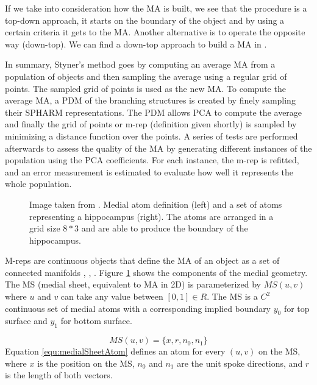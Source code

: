 If we take into consideration how the MA is built, we see that the procedure is a top-down approach, 
it starts on the boundary of the object and by using a certain criteria it gets to the MA. 
Another alternative is to operate the opposite way (down-top). 
We can find a down-top approach to build a MA in \cite{styner2001medial}.

In summary, Styner's method goes by computing an average MA
from a population of objects and then sampling the average using a regular grid of
points. The sampled grid of points is used as the new MA.
To compute the average MA, a PDM of
the branching structures is created 
by finely sampling their SPHARM representations.
The PDM allows PCA to compute the average and 
finally the grid of points or m-rep (definition given shortly) is sampled by 
minimizing a distance function over the points.
A series of tests are performed afterwards to assess
the quality of the MA by 
generating different instances of the population using 
the PCA coefficients. For each instance, the m-rep is refitted,
and an error measurement is estimated to evaluate 
how well it represents the whole population. 

\begin{figure} 
 \centering  
 \caption[Medial atom definition.]{Image taken from \cite{fletcher2004principal}. Medial atom definition (left) and a set of atoms representing a hippocampus (right).
          The atoms are arranged in a grid size $8*3$ and are able to produce the boundary of the hippocampus.}
 \label{fig:3DmedialGeometry}  
\end{figure}

M-reps are continuous objects that define the MA of an object as 
a set of connected manifolds \cite{pizer1999segmentation},  \cite{yushkevich2003continuous}, \cite{pizer2003deformable}.
Figure \ref{fig:3DmedialGeometry} shows the components of the medial geometry. 
The MS (medial sheet, equivalent to MA in 2D)
is parameterized by $MS(u, v)$ where $u$ and $v$ can take any value between 
$[0, 1] \in R$. 
The MS is a $C^2$ continuous set of medial atoms with a corresponding
implied boundary $y_{0}$ for top surface and $y_{1}$ for bottom surface. 

\begin{equation}
 MS(u, v) = \{x, r, n_0, n_1\}
 \label{equ:medialSheetAtom}
\end{equation}
Equation \ref{equ:medialSheetAtom} defines an atom for 
every $(u, v)$ on the MS, 
where $x$ is the position on the MS, $n_0$ and $n_1$
are the unit spoke directions, and $r$ is the 
length of both vectors. 

